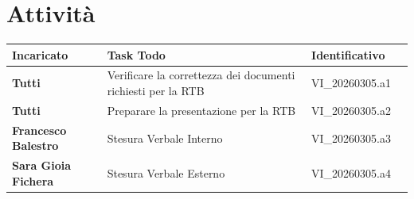 \documentclass[a4paper,12pt]{article}
\begin{document}
    \section{Attività} {
        \begin{tabularx}{\textwidth}{|l|X|l|l|}
            \hline
            \textbf{Incaricato} & \textbf{Task Todo} & \textbf{Identificativo} \\
            \hline
            \textbf{Tutti} & Verificare la correttezza dei documenti richiesti per la RTB & VI\_20260305.a1 \\
            \hline
            \textbf{Tutti} & Preparare la presentazione per la RTB & VI\_20260305.a2 \\
            \hline
            \textbf{Francesco Balestro} & Stesura Verbale Interno & VI\_20260305.a3 \\
            \hline
            \textbf{Sara Gioia Fichera} & Stesura Verbale Esterno & VI\_20260305.a4 \\
            \hline
        \end{tabularx}
    }
\end{document}
